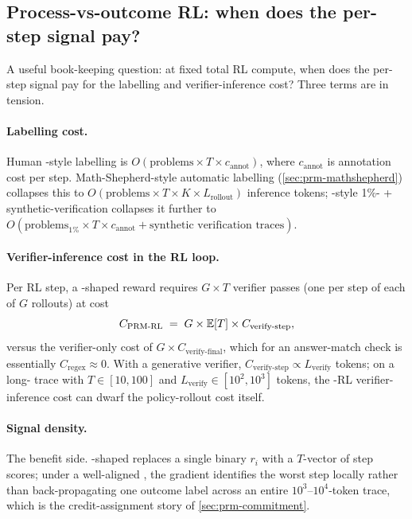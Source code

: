 \subsection{Process-vs-outcome RL: when does the per-step signal pay?}
\label{sec:prm-survival-cost}

A useful book-keeping question: at fixed total RL compute, when does
the per-step  signal pay for the labelling and verifier-inference
cost? Three terms are in tension.

\paragraph{Labelling cost.} Human -style labelling is
$O(\text{problems} \times T \times c_{\text{annot}})$, where
$c_{\text{annot}}$ is annotation cost per step. Math-Shepherd-style
automatic labelling (\cref{sec:prm-mathshepherd}) collapses this to
$O(\text{problems} \times T \times K \times L_{\text{rollout}})$
inference tokens; -style 1\%- + synthetic-verification
collapses it further to $O(\text{problems}_{1\%} \times T \times c_{\text{annot}}
+ \text{synthetic verification traces})$.

\paragraph{Verifier-inference cost in the RL loop.} Per RL step, a
-shaped reward requires $G \times T$ verifier passes (one per step
of each of $G$ rollouts) at cost
\begin{equation}
  C_{\text{PRM-RL}} \;=\; G \times \operatorname{\mathbb{E}}[T] \times C_{\text{verify-step}},
  \label{eq:prm-rl-cost}
\end{equation}
versus the verifier-only  cost of $G \times C_{\text{verify-final}}$,
which for an answer-match check is essentially $C_{\text{regex}}
\approx 0$. With a generative verifier, $C_{\text{verify-step}}
\propto L_{\text{verify}}$ tokens; on a long- trace with $T \in
[10, 100]$ and $L_{\text{verify}} \in [10^2, 10^3]$ tokens, the -RL
verifier-inference cost can dwarf the policy-rollout cost itself.

\paragraph{Signal density.} The benefit side. -shaped  replaces
a single binary $r_i$ with a $T$-vector of step scores; under a
well-aligned , the gradient identifies the worst step locally
rather than back-propagating one outcome label across an entire
$10^3$--$10^4$-token trace, which is the credit-assignment story of
\cref{sec:prm-commitment}.

